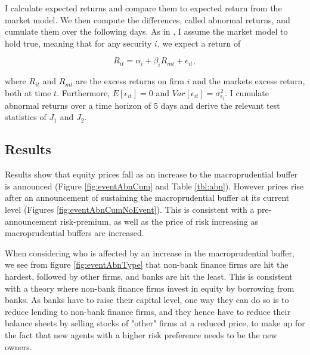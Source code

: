 \documentclass[11pt]{article}
\begin{document}
I calculate expected returns and compare them to expected return from the market model. We then compute the differences, called abnormal returns, and cumulate them over the following days. As in \citet{Campbell1997}, I assume the market model to hold true, meaning that for any security $i$, we expect a return of 

\begin{equation}
R_{it} = \alpha_i + \beta_i  R_{mt} + \epsilon_{it},
\end{equation}

where $R_{it}$ and $R_{mt}$ are the excess returns on firm $i$ and the markets excess return, both at time $t$. Furthermore, $E[\epsilon_{it}] = 0$ and $Var[\epsilon_{it}] = \sigma^2_{\epsilon_{i}}$. I cumulate abnormal returns over a time horizon of 5 days and derive the relevant test statistics of $J_1$ and $J_2$.






\subsection{Results}

Results show that equity prices fall as an increase to the macroprudential buffer is announced (Figure \ref{fig:eventAbnCum} and Table \ref{tbl:abn}). However prices rise after an announcement of sustaining the macroprudential buffer at its current level (Figures \ref{fig:eventAbnCumNoEvent}). This is consistent with a pre-announcement risk-premium, as well as the price of risk increasing as macroprudential buffers are increased.

When considering who is affected by an increase in the macroprudential buffer, we see from figure \ref{fig:eventAbnType} that non-bank finance firms are hit the hardest, followed by other firms, and banks are hit the least. This is consistent with a theory where non-bank finance firms invest in equity by borrowing from banks. As banks have to raise their capital level, one way they can do so is to reduce lending to non-bank finance firms, and they hence have to reduce their balance sheets by selling stocks of "other" firms at a reduced price, to make up for the fact that new agents with a higher risk preference needs to be the new owners. 
\end{document}
